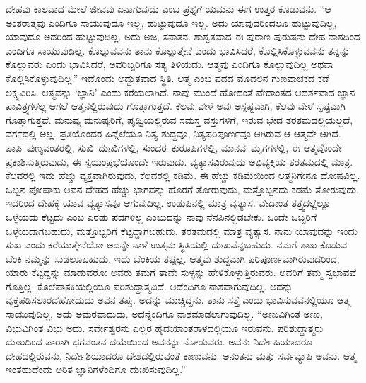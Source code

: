 ದೇಹವು ಕಾಲವಾದ ಮೇಲೆ ಜೀವವು ಏನಾಗುವುದು ಎಂಬ ಪ್ರಶ್ನೆಗೆ ಯಮನು ಈಗ ಉತ್ತರ ಕೊಡುವನು. “ಆ ಅಂತರಾತ್ಮವು ಎಂದಿಗೂ ಸಾಯುವುದೂ ಇಲ್ಲ, ಹುಟ್ಟುವುದೂ ಇಲ್ಲ. ಅದು ಯಾವುದರಿಂದಲೂ ಹುಟ್ಟುವುದಿಲ್ಲ, ಯಾವುದೂ ಅದರಿಂದ ಹುಟ್ಟುವುದಿಲ್ಲ. ಅದು ಅಜ, ಸನಾತನ. ಶಾಶ್ವತವಾದ ಈ ಪುರಾಣ ಪುರುಷನು ದೇಹ ನಾಶದಿಂದ ಎಂದಿಗೂ ಸಾಯುವುದಿಲ್ಲ. ಕೊಲ್ಲುವವನು ತಾನು ಕೊಲ್ಲುತ್ತೇನೆ ಎಂದು ಭಾವಿಸಿದರೆ, ಕೊಲ್ಲಿಸಿಕೊಳ್ಳುವವನು ತನ್ನನ್ನು ಕೊಲ್ಲುವರು ಎಂದು ಭಾವಿಸಿದರೆ, ಅವರಿಬ್ಬರಿಗೂ ಸತ್ಯ ತಿಳಿಯದು. ಆತ್ಮವು ಎಂದಿಗೂ ಕೊಲ್ಲುವುದಿಲ್ಲ ಅಥವಾ ಕೊಲ್ಲಿಸಿಕೊಳ್ಳುವುದಿಲ್ಲ.” ಇದೊಂದು ಅದ್ಭುತವಾದ ಸ್ಥಿತಿ. ಆತ್ಮ ಎಂಬ ಪದದ ಮೊದಲಿನ ಗುಣವಾಚಕದ ಕಡೆ ಲಕ್ಷ್ಯವಿರಿಸಿ. ಆತ್ಮವನ್ನು ‘ಜ್ಞಾನಿ’ ಎಂದು ಕರೆಯಲಾಗಿದೆ. ನಾವು ಮುಂದೆ ಹೋದಂತೆ ವೇದಾಂತದ ಆದರ್ಶವಾದ ಜ್ಞಾನ ಪಾವಿತ್ರ್ಯಗಳೆಲ್ಲ ಆಗಲೆ ಆತ್ಮನಲ್ಲಿರುವುದು ಗೊತ್ತಾಗುತ್ತದೆ. ಕೆಲವು ವೇಳೆ ಅವು ಅಸ್ಪಷ್ಟವಾಗಿ, ಕೆಲವು ವೇಳೆ ಸ್ಪಷ್ಟವಾಗಿ ಗೊತ್ತಾಗುತ್ತವೆ. ಮನುಷ್ಯ ಮನುಷ್ಯರಿಗೆ, ಪೃಥ್ವಿಯಲ್ಲಿರುವ ಸಮಸ್ತ ವಸ್ತುಗಳಿಗೆ, ಇರುವ ಭೇದ ತರತಮದಲ್ಲಿಯಲ್ಲದೆ, ವರ್ಗದಲ್ಲಿ ಅಲ್ಲ. ಪ್ರತಿಯೊಂದರ ಹಿನ್ನೆಲೆಯೂ ನಿತ್ಯ ಶುದ್ಧವೂ, ನಿತ್ಯಪರಿಪೂರ್ಣವೂ ಆಗಿರುವ ಆ ಆತ್ಮವೇ ಆಗಿದೆ. ಪಾಪಿ–ಪುಣ್ಯವಂತರಲ್ಲಿ, ಸುಖಿ–ದುಃಖಿಗಳಲ್ಲಿ, ಸುಂದರ–ಕುರೂಪಿಗಳಲ್ಲಿ, ಮಾನವ–ಮೃಗಗಳಲ್ಲಿ, ಈ ಆತ್ಮವೊಂದೇ ಪ್ರಕಾಶಿಸುತ್ತಿರುವುದು, ಈ ಸ್ವಯಂಪ್ರಭೆಯೊಂದೇ ಇರುವುದು. ವ್ಯತ್ಯಾಸವಿರುವುದು ಅಭಿವ್ಯಕ್ತಿಯ ತರತಮದಲ್ಲಿ ಮಾತ್ರ. ಕೆಲವರಲ್ಲಿ ಇದು ಹೆಚ್ಚು ವ್ಯಕ್ತವಾಗಿರುವುದು, ಕೆಲವರಲ್ಲಿ ಕಡಿಮೆ. ಈ ಹೆಚ್ಚು ಕಡಿಮೆಯಿಂದ ಆತ್ಮನಿಗೇನೂ ದೋಷವಿಲ್ಲ. ಒಬ್ಬನ ಪೋಷಾಕು ಅವನ ದೇಹದ ಹೆಚ್ಚು ಭಾಗವನ್ನು ಹೊರಗೆ ತೋರುವುದು, ಮತ್ತೊಬ್ಬನದು ಕಡಮೆ ತೋರುವುದು. ಇದರಿಂದ ದೇಹಕ್ಕೆ ಯಾವ ವ್ಯತ್ಯಾಸವೂ ಆಗುವುದಿಲ್ಲ. ಉಡುಪಿನಲ್ಲಿ ಮಾತ್ರ ವ್ಯತ್ಯಾಸ. ವೇದಾಂತ ತತ್ತ್ವದಲ್ಲೆಲ್ಲೂ ಒಳ್ಳೆಯದು ಕೆಟ್ಟದು ಎಂಬ ಎರಡು ಪದಗಳಿಲ್ಲ ಎಂಬುದನ್ನು ನಾವು ನೆನಪಿನಲ್ಲಿಡಬೇಕು. ಒಂದೇ ಒಬ್ಬರಿಗೆ ಒಳ್ಳೆಯದಾಗಬಹುದು, ಮತ್ತೊಬ್ಬರಿಗೆ ಕೆಟ್ಟದ್ದಾಗಬಹುದು. ತರತಮದಲ್ಲಿ ಮಾತ್ರ ವ್ಯತ್ಯಾಸ. ನಾನು ಯಾವುದನ್ನು ಇಂದು ಸುಖ ಎಂದು ಕರೆಯುತ್ತೇನೆಯೋ ಅದನ್ನೇ ನಾಳೆ ಉತ್ತಮ ಸ್ಥಿತಿಯಲ್ಲಿ ದುಃಖವೆನ್ನಬಹುದು. ನಮಗೆ ಶಾಖ ಕೊಡುವ ಬೆಂಕಿ ನಮ್ಮನ್ನು ಸುಡಲೂಬಹುದು. ಇದು ಬೆಂಕಿಯ ತಪ್ಪಲ್ಲ. ಆತ್ಮವು ಶುದ್ಧವಾಗಿ ಪರಿಪೂರ್ಣವಾಗಿರುವುದರಿಂದ, ಯಾರು ಕೆಟ್ಟದ್ದನ್ನು ಮಾಡುವರೋ ಅವರು ತಮಗೆ ತಾವೇ ಸುಳ್ಳನ್ನು ಹೇಳಿಕೊಳ್ಳುತ್ತಿರುವರು. ಅವರಿಗೆ ತಮ್ಮ ಸ್ವಭಾವವೆ ಗೊತ್ತಿಲ್ಲ. ಕೊಲೆಪಾತಕಿಯಲ್ಲಿಯೂ ಪರಿಶುದ್ಧಾತ್ಮವಿದೆ. ಅದೆಂದಿಗೂ ನಾಶವಾಗುವುದಿಲ್ಲ. ಅದನ್ನು ವ್ಯಕ್ತಪಡಿಸಲಾರದೆಹೋದುದು ಅವನ ತಪ್ಪು. ಅದನ್ನು ಮುಚ್ಚಿದ್ದನು. ತಾನು ಸತ್ತೆ ಎಂದು ಭಾವಿಸುವವನಲ್ಲಿಯೂ ಆತ್ಮ ಸಾಯುವುದಿಲ್ಲ, ಅದು ಅಮರವಾದುದು. ಅದನ್ನೆಂದಿಗೂ ನಾಶಮಾಡಲಾಗುವುದಿಲ್ಲ. “ಅಣುವಿಗಿಂತ ಅಣು, ವಿಭುವಿಗಿಂತ ವಿಭು ಅದು. ಸರ್ವೇಶ್ವರನು ಎಲ್ಲರ ಹೃದಯಾಂತರಾಳದಲ್ಲಿಯೂ ಇರುವನು. ಪರಿಶುದ್ಧಾತ್ಮರು ದುಃಖದಿಂದ ಪಾರಾಗಿ ಭಗವಂತನ ದಯೆಯಿಂದ ಅವನನ್ನು ನೋಡುವರು. ಅವನು ನಿರ್ದೇಹಿಯಾದರೂ ದೇಹದಲ್ಲಿರುವನು, ನಿರ್ದೇಶಿಯಾದರೂ ದೇಶದಲ್ಲಿರುವಂತೆ ಕಾಣುವನು. ಅನಂತನು ಮತ್ತು ಸರ್ವವ್ಯಾಪಿ ಅವನು. ಆತ್ಮ ಇಂತಹುದೆಂದು ಅರಿತ ಜ್ಞಾನಿಗಳೆಂದಿಗೂ ದುಃಖಿಸುವುದಿಲ್ಲ.”

\vskip 0.2cm 

